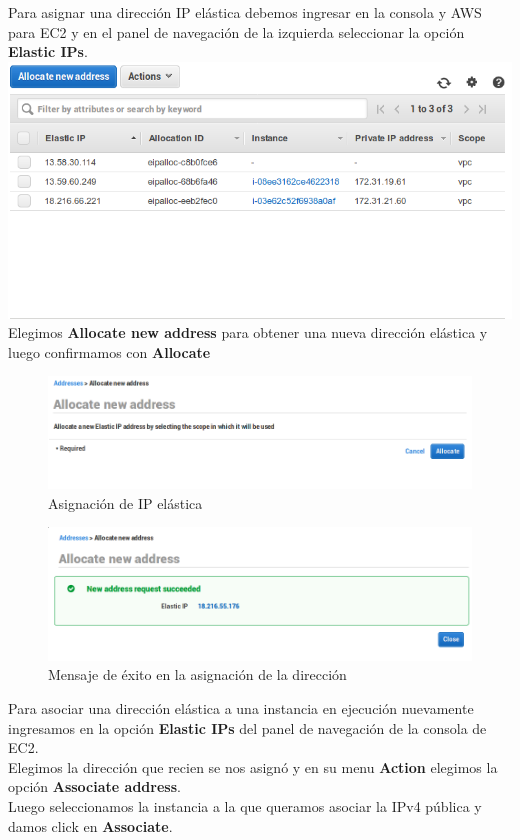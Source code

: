 \documentclass[12pt]{article}
\begin{document}
Para asignar una dirección IP elástica debemos ingresar en la consola y \textsc{AWS} para \textsf{EC2} y en el panel de navegación de la izquierda seleccionar la opción \textbf{Elastic IPs}.\\
\includegraphics[width=\textwidth]{elastic_ip}
\\
Elegimos \textbf{Allocate new address} para obtener una nueva dirección elástica y luego confirmamos con \textbf{Allocate}
\begin{figure}[H]
  \centering
  \includegraphics[width=\textwidth]{elastic_ip_allocate}
  \caption{Asignación de IP elástica}
\end{figure}

\begin{figure}[H]
  \centering
  \includegraphics[width=\textwidth]{elastic_ip_success}
  \caption{Mensaje de éxito en la asignación de la dirección}
\end{figure}

Para asociar una dirección elástica a una instancia en ejecución nuevamente ingresamos en la opción \textbf{Elastic IPs} del panel de navegación de la consola de \textsf{EC2}. \\
Elegimos la dirección que recien se nos asignó y en su menu \textbf{Action} elegimos la opción \textbf{Associate address}. \\
Luego seleccionamos la instancia a la que queramos asociar la IPv4 pública y damos click en \textbf{Associate}.
\end{document}
